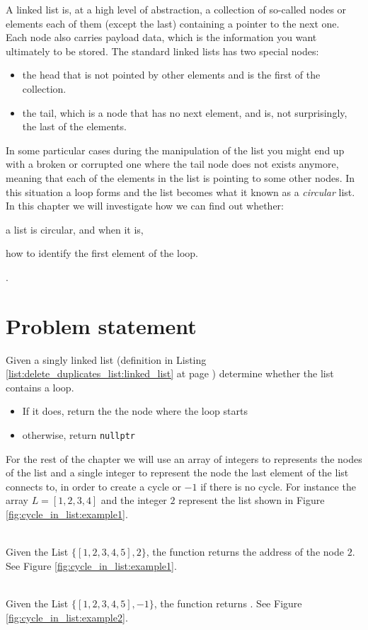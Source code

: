 A linked list is, at a high level of abstraction, a collection of so-called nodes or elements  each of them (except the last) containing
a pointer to the next one. 
Each node also carries payload data, which is the information you want ultimately to be stored.
The standard linked lists has two special nodes:
\begin{itemize}
	\item the head that is not pointed by other elements and is the first of the collection. 
	\item the tail, which is a node that has no next element, and is, not surprisingly, the last of the elements.
\end{itemize}

In some particular cases during the manipulation of the list you might end up with a broken or corrupted one  where the tail node does not exists anymore, meaning that
each of the elements in the list is pointing to some other nodes.
In this situation a loop forms and the list becomes what it known as a \textit{circular} list.
In this chapter we will investigate how we can find out whether:
\begin{enumerate*}
	\item a list is circular, and when it is,
	\item how to identify the first element of the loop.
\end{enumerate*}.

\section{Problem statement}
\begin{exercise}
Given a singly linked list (definition in Listing \ref{list:delete_duplicates_list:linked_list} at
page \pageref{list:delete_duplicates_list:linked_list}) determine whether the list contains a loop.
\begin{itemize}
		\item If it does, return the the node where the loop starts
		\item otherwise, return \lstinline[columns=fixed]{nullptr}
\end{itemize}

For the rest of the chapter we will use an array of integers to represents the nodes of the list and
a single integer to represent the node the last element of the list connects to, in order to create
a cycle or $-1$ if there is no cycle. For instance  the array $L=[1,2,3,4]$ and the integer $2$
represent the list shown in Figure \ref{fig:cycle_in_list:example1}.

\begin{example}
	\hfill \\
	Given the List $\{[1,2,3,4,5],2\}$, the function returns the address of the node $2$. See Figure
	\ref{fig:cycle_in_list:example1}.
\end{example}

\begin{example}
	\hfill \\
	Given the List $\{[1,2,3,4,5],-1\}$, the function returns . See Figure
	\ref{fig:cycle_in_list:example2}.
\end{example}
\end{exercise}

